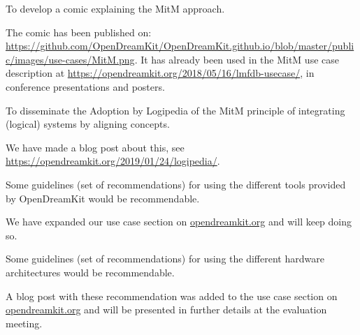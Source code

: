 \begin{recommendation}
  To develop a comic explaining the MitM approach.
\end{recommendation}
The comic has been published on:
\url{https://github.com/OpenDreamKit/OpenDreamKit.github.io/blob/master/public/images/use-cases/MitM.png}. It
has already been used in the MitM use case description at
\url{https://opendreamkit.org/2018/05/16/lmfdb-usecase/}, in conference presentations and
posters.

\begin{recommendation}
  To disseminate the Adoption by Logipedia of the MitM principle of
  integrating (logical) systems by aligning concepts.
\end{recommendation}
We have made a blog post about this, see \url{https://opendreamkit.org/2019/01/24/logipedia/}.

\begin{recommendation}
  Some guidelines (set of recommendations) for using the different
  tools provided by OpenDreamKit would be recommendable.
\end{recommendation}
We have expanded our use case section on \url{opendreamkit.org} and
will keep doing so.


\begin{recommendation}
  Some guidelines (set of recommendations) for using the different
  hardware architectures would be recommendable.
\end{recommendation}
 A blog post with these recommendation was added to the use case section on \url{opendreamkit.org} and will be
 presented in further details at the evaluation meeting.


